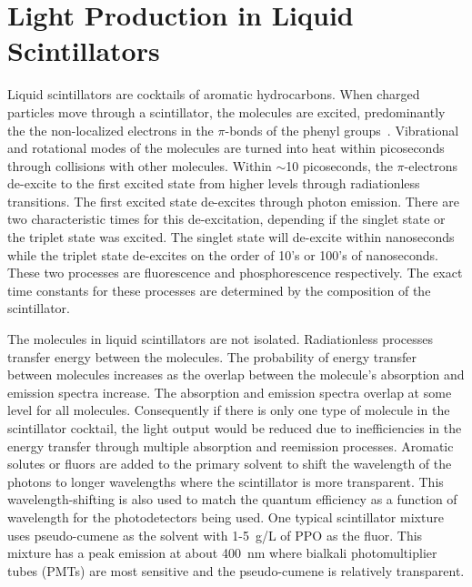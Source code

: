 \documentclass[aps,prc,twocolumn,groupedaddress,showpacs,amsmath,amssymb,floatfix,superscriptaddress]{revtex4}
\begin{document}
\section{Light Production in Liquid Scintillators}
Liquid scintillators are cocktails of aromatic hydrocarbons. When
charged particles move through a scintillator, the molecules are
excited, predominantly the the non-localized electrons in the
$\pi$-bonds of the phenyl groups~\cite{scintillator_ref}. Vibrational
and rotational modes of the molecules are turned into heat within
picoseconds through collisions with other molecules.  Within $\sim$10
picoseconds, the $\pi$-electrons de-excite to the first excited state
from higher levels through radiationless transitions. The first
excited state de-excites through photon emission. There are two
characteristic times for this de-excitation, depending if the singlet
state or the triplet state was excited.  The singlet state will
de-excite within nanoseconds while the triplet state de-excites on the
order of 10's or 100's of nanoseconds. These two processes are
fluorescence and phosphorescence respectively. The exact time
constants for these processes are determined by the composition of the
scintillator.

The molecules in liquid scintillators are not isolated. Radiationless
processes transfer energy between the molecules. The probability of
energy transfer between molecules increases as the overlap between the
molecule's absorption and emission spectra increase. The absorption
and emission spectra overlap at some level for all
molecules. Consequently if there is only one type of molecule in the
scintillator cocktail, the light output would be reduced due to
inefficiencies in the energy transfer through multiple absorption and
reemission processes. Aromatic solutes or fluors are added to the
primary solvent to shift the wavelength of the photons to longer
wavelengths where the scintillator is more transparent. This
wavelength-shifting is also used to match the quantum efficiency as a
function of wavelength for the photodetectors being used. One typical
scintillator mixture uses pseudo-cumene as the solvent with 1-5~g/L of
PPO as the fluor. This mixture has a peak emission at about 400~nm
where bialkali photomultiplier tubes (PMTs) are most sensitive and the
pseudo-cumene is relatively transparent.
\end{document}
